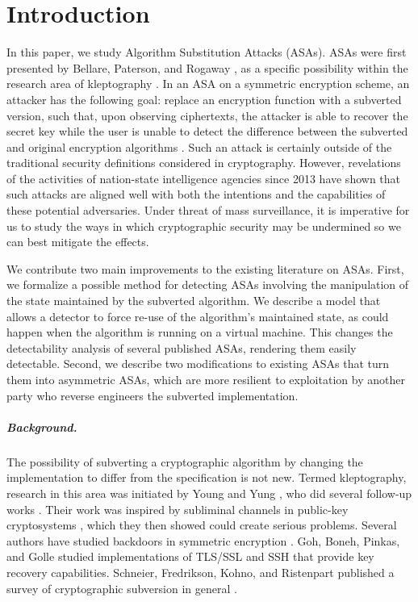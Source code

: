 \chapter{Introduction}

In this paper, we study Algorithm Substitution Attacks (ASAs). ASAs were first presented by Bellare, Paterson, and Rogaway \cite{C:BelPatRog14}, as a specific possibility within the research area of kleptography \cite{C:YouYun96,EC:YouYun97,FSE:YouYun98,SAC:YouYun04,ACISP:YouYun03}. In an ASA on a symmetric encryption scheme, an attacker has the following goal: replace an encryption function with a subverted version, such that, upon observing ciphertexts, the attacker is able to recover the secret key while the user is unable to detect the difference between the subverted and original encryption algorithms \cite{C:BelPatRog14}. Such an attack is certainly outside of the traditional security definitions considered in cryptography. However, revelations of the activities of nation-state intelligence agencies since 2013 \cite{snowden} have shown that such attacks are aligned well with both the intentions and the capabilities of these potential adversaries. Under threat of mass surveillance, it is imperative for us to study the ways in which cryptographic security may be undermined so we can best mitigate the effects.

We contribute two main improvements to the existing literature on ASAs. First, we formalize a possible method for detecting ASAs involving the manipulation of the state maintained by the subverted algorithm. We describe a model that allows a detector to force re-use of the algorithm's maintained state, as could happen when the algorithm is running on a virtual machine. This changes the detectability analysis of several published ASAs, rendering them easily detectable. Second, we describe two modifications to existing ASAs that turn them into asymmetric ASAs, which are more resilient to exploitation by another party who reverse engineers the subverted implementation.

\paragraph{Background.} The possibility of subverting a cryptographic algorithm by changing the implementation to differ from the specification is not new. Termed kleptography, research in this area was initiated by Young and Yung \cite{C:YouYun96}, who did several follow-up works  \cite{EC:YouYun97,FSE:YouYun98,SAC:YouYun04,ACISP:YouYun03}. Their work was inspired by subliminal channels in public-key cryptosystems \cite{EC:Simmons84,C:Desmedt88}, which they then showed could create serious problems. Several authors have studied backdoors in symmetric encryption \cite{FSE:RijPre97,FSE:Paterson99}. Goh, Boneh, Pinkas, and Golle \cite{ISC:GBPG03} studied implementations of TLS/SSL and SSH that provide key recovery capabilities. Schneier, Fredrikson, Kohno, and Ristenpart published a survey of cryptographic subversion in general \cite{EPRINT:SFKR15}.

